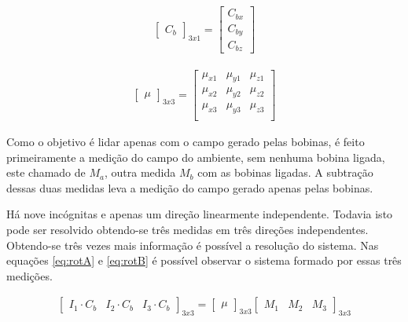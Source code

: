 \begin{gather}
\label{eq:mC}
 \begin{bmatrix} C_b \end{bmatrix}_{3x1}
 =
  \begin{bmatrix}
   C_{bx} \\
   C_{by} \\
   C_{bz}
   \end{bmatrix}
\end{gather}

\begin{gather}
\label{eq:mu}
 \begin{bmatrix} \mu \end{bmatrix}_{3x3}
 =
  \begin{bmatrix}
   \mu_{x1} & \mu_{y1} & \mu_{z1} \\
   \mu_{x2} & \mu_{y2} & \mu_{z2} \\
   \mu_{x3} & \mu_{y3} & \mu_{z3} \\
   \end{bmatrix}
\end{gather}

Como o objetivo é lidar apenas com o campo gerado pelas bobinas, é feito primeiramente a medição do campo do ambiente, sem nenhuma bobina ligada, este chamado de $M_a$, outra medida $M_b$ com as bobinas ligadas. A subtração dessas duas medidas leva a medição do campo gerado apenas pelas bobinas.

Há nove incógnitas e apenas um direção linearmente independente. Todavia isto pode ser resolvido obtendo-se três medidas em três direções independentes. Obtendo-se três vezes mais informação é possível a resolução do sistema. Nas equações \ref{eq:rotA} e \ref{eq:rotB} é possível observar o sistema formado por essas três medições.

\begin{gather}
\label{eq:rotA}
 \begin{bmatrix} I_1\cdot C_{b}  & I_2\cdot C_{b}  & I_3\cdot C_{b}  \end{bmatrix}_{3x3}
 =
  \begin{bmatrix}
   \mu
   \end{bmatrix}_{3x3}
 \begin{bmatrix} M_1& M_2 & M_3 \end{bmatrix}_{3x3}
\end{gather}


